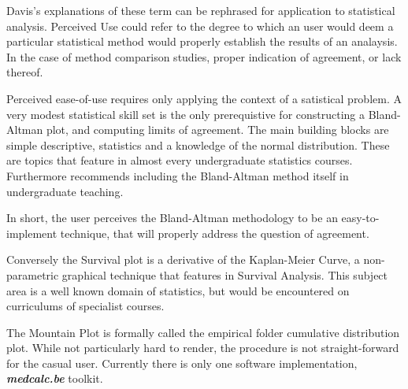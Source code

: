 \documentclass[12pt, a4paper]{report}
\theoremstyle{plain}
\theoremstyle{definition}
\theoremstyle{remark}
\begin{document}
	Davis's explanations of these term can be rephrased for application to statistical analysis. 
	Perceived Use could refer to the degree to which an user would deem a particular statistical method would properly establish the results of an analaysis. In the case of method comparison studies, proper indication of agreement, or lack thereof.
	
	
	Perceived ease-of-use requires only applying the context of a satistical problem. A very modest statistical skill set is the only prerequistive for constructing a Bland-Altman plot, and computing limits of agreement. The main building blocks 
	are simple descriptive, statistics and a knowledge of the normal distribution. These are topics that feature in almost every undergraduate statistics courses. Furthermore \citet{kikozak2014including} recommends including the Bland-Altman method itself in undergraduate teaching.
	
	In short, the user perceives the Bland-Altman methodology to be an easy-to-implement technique, that will properly address the question of agreement.
	
	Conversely the Survival plot is a derivative of the Kaplan-Meier Curve, a non-parametric graphical technique that features in Survival Analysis. This subject area is a well known domain of statistics, but would be encountered 
	on curriculums of specialist courses. 
	
	The Mountain Plot is formally called the empirical folder cumulative distribution plot. While not particularly hard to render, the procedure is not straight-forward for the casual user. Currently there is only one software implementation, \textbf{\textit{medcalc.be}} toolkit.



\end{document}
